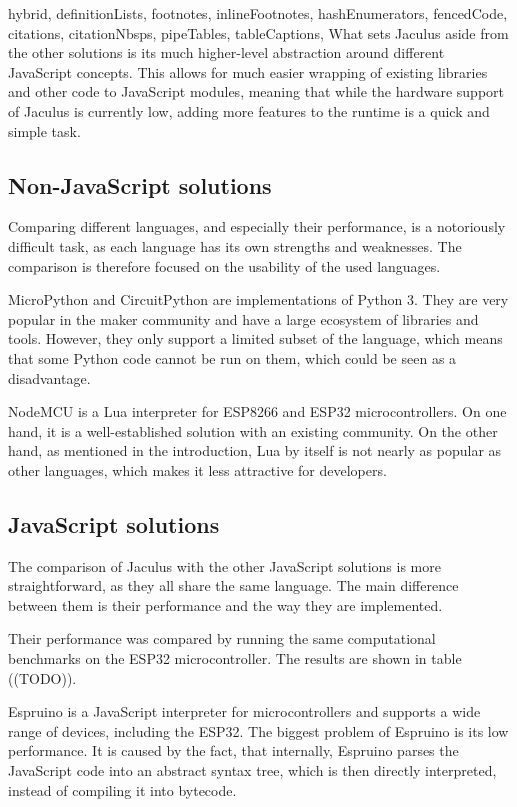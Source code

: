\begin{markdown*}{%
  hybrid,
  definitionLists,
  footnotes,
  inlineFootnotes,
  hashEnumerators,
  fencedCode,
  citations,
  citationNbsps,
  pipeTables,
  tableCaptions,
}
What sets Jaculus aside from the other solutions is its much higher-level abstraction around different JavaScript concepts. This allows for much easier wrapping of existing libraries and other code to JavaScript modules, meaning that while the hardware support of Jaculus is currently low, adding more features to the runtime is a quick and simple task.

\subsection{Non-JavaScript solutions}

Comparing different languages, and especially their performance, is a notoriously difficult task, as each language has its own strengths and weaknesses. The comparison is therefore focused on the usability of the used languages.

MicroPython and CircuitPython are implementations of Python 3. They are very popular in the maker community and have a large ecosystem of libraries and tools. However, they only support a limited subset of the language, which means that some Python code cannot be run on them, which could be seen as a disadvantage.

NodeMCU is a Lua interpreter for ESP8266 and ESP32 microcontrollers. On one hand, it is a well-established solution with an existing community. On the other hand, as mentioned in the introduction, Lua by itself is not nearly as popular as other languages, which makes it less attractive for developers.

\subsection{JavaScript solutions}

The comparison of Jaculus with the other JavaScript solutions is more straightforward, as they all share the same language. The main difference between them is their performance and the way they are implemented.

Their performance was compared by running the same computational benchmarks on the ESP32 microcontroller. The results are shown in table ((TODO)).


Espruino is a JavaScript interpreter for microcontrollers and supports a wide range of devices, including the ESP32. The biggest problem of Espruino is its low performance. It is caused by the fact, that internally, Espruino parses the JavaScript code into an abstract syntax tree, which is then directly interpreted, instead of compiling it into bytecode.


\end{markdown*}
